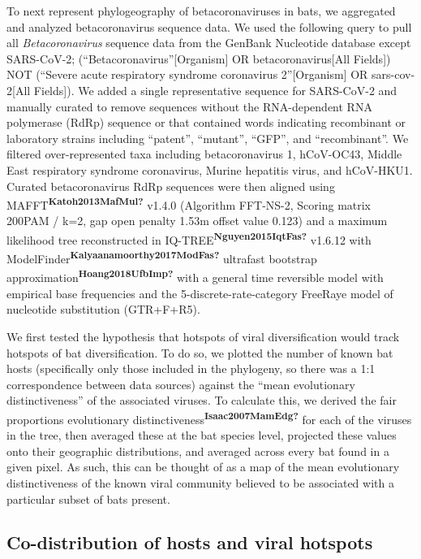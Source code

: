 \documentclass[10pt,oneside]{article}
\begin{document}
To next represent phylogeography of betacoronaviruses in bats, we
aggregated and analyzed betacoronavirus sequence data. We used the
following query to pull all \emph{Betacoronavirus} sequence data from
the GenBank Nucleotide database except SARS-CoV-2;
(``Betacoronavirus''{[}Organism{]} OR betacoronavirus{[}All Fields{]})
NOT (``Severe acute respiratory syndrome coronavirus 2''{[}Organism{]}
OR sars-cov-2{[}All Fields{]}). We added a single representative
sequence for SARS-CoV-2 and manually curated to remove sequences without
the RNA-dependent RNA polymerase (RdRp) sequence or that contained words
indicating recombinant or laboratory strains including ``patent'',
``mutant'', ``GFP'', and ``recombinant''. We filtered over-represented
taxa including betacoronavirus 1, hCoV-OC43, Middle East respiratory
syndrome coronavirus, Murine hepatitis virus, and hCoV-HKU1. Curated
betacoronavirus RdRp sequences were then aligned using
MAFFT\textsuperscript{\textbf{Katoh2013MafMul?}} v1.4.0 (Algorithm
FFT-NS-2, Scoring matrix 200PAM / k=2, gap open penalty 1.53m offset
value 0.123) and a maximum likelihood tree reconstructed in
IQ-TREE\textsuperscript{\textbf{Nguyen2015IqtFas?}} v1.6.12 with
ModelFinder\textsuperscript{\textbf{Kalyaanamoorthy2017ModFas?}}
ultrafast bootstrap
approximation\textsuperscript{\textbf{Hoang2018UfbImp?}} with a general
time reversible model with empirical base frequencies and the
5-discrete-rate-category FreeRaye model of nucleotide substitution
(GTR+F+R5).

We first tested the hypothesis that hotspots of viral diversification
would track hotspots of bat diversification. To do so, we plotted the
number of known bat hosts (specifically only those included in the
phylogeny, so there was a 1:1 correspondence between data sources)
against the ``mean evolutionary distinctiveness'' of the associated
viruses. To calculate this, we derived the fair proportions evolutionary
distinctiveness\textsuperscript{\textbf{Isaac2007MamEdg?}} for each of
the viruses in the tree, then averaged these at the bat species level,
projected these values onto their geographic distributions, and averaged
across every bat found in a given pixel. As such, this can be thought of
as a map of the mean evolutionary distinctiveness of the known viral
community believed to be associated with a particular subset of bats
present.

\hypertarget{co-distribution-of-hosts-and-viral-hotspots}{%
\subsection{Co-distribution of hosts and viral
hotspots}\label{co-distribution-of-hosts-and-viral-hotspots}}
\end{document}
